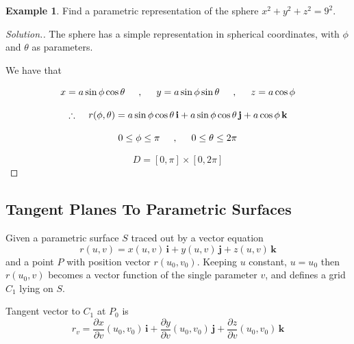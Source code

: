 \documentclass[11pt,a4paper]{article}
\theoremstyle{definition}
\newtheorem{exa}[thm]{Example}
\newenvironment{solution}
  {\renewcommand{\qedsymbol}{}\begin{proof}[\textit{Solution}.]}
  {\end{proof}}
\begin{document}
\begin{exa}


Find a parametric representation of the sphere $x^2 + y^2 + z^2  = 9^2$.
\end{exa}


\begin{solution}


The sphere has a simple representation in spherical coordinates, with $\phi$ and $\theta$ as parameters.


We have that

$$x = a\sin \phi \cos \theta\hspace{0.5cm}, \hspace{0.5cm} y = a\sin \phi\sin \theta\hspace{0.5cm}, \hspace{0.5cm} z = a\cos \phi$$

$$\therefore\hspace{0.4cm} r(\phi, \theta) = a\sin \phi \cos \theta\, \textbf{i} + a \sin \phi \cos \theta\, \textbf{j} + a\cos \phi \,\textbf{k}$$

$$0\leq \phi \leq \pi\hspace{0.5cm}, \hspace{0.5cm} 0\leq \theta \leq 2\pi$$

$$D = [0,\pi]\times [0,2\pi]$$
\end{solution}


{\color[wave]{485}\subsection{Tangent Planes To Parametric Surfaces}}

Given a parametric surface $S$ traced out by a vector equation $$r(u,v) = x(u,v)\, \textbf{i} + y(u,v)\,\textbf{j} + z(u,v)\,\textbf{k}$$ and a point $P$ with position vector $r(u_0,v_0)$. Keeping $u$ constant, $u=u_0$ then $r(u_0,v)$ becomes a vector function of the single parameter $v$, and defines a grid $C_1$ lying on $S$.


Tangent vector to $C_1$ at $P_0$ is $$r_v = \frac{\partial x}{\partial v}(u_0,v_0)\,\textbf{i} + \frac{\partial y}{\partial v}(u_0,v_0)\,\textbf{j} +\frac{\partial z}{\partial v}(u_0,v_0)\,\textbf{k}$$

\end{document}
